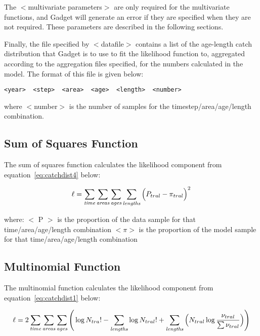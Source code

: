 \documentclass[10pt,twoside]{book}
\begin{document}
\bigskip
The $<$multivariate parameters$>$ are only required for the multivariate functions, and Gadget will generate an error if they are specified when they are not required.  These parameters are described in the following sections.

\bigskip
Finally, the file specified by $<$datafile$>$ contains a list of the age-length catch distribution that Gadget is to use to fit the likelihood function to, aggregated according to the aggregation files specified, for the numbers calculated in the model.  The format of this file is given below:

{\small\begin{verbatim}
<year>  <step>  <area>  <age>  <length>  <number>
\end{verbatim}}

where $<$number$>$ is the number of samples for the timestep/area/age/length combination.

\subsection{Sum of Squares Function}
The sum of squares function calculates the likelihood component from equation~\ref{eq:catchdist4} below:

\begin{equation}\label{eq:catchdist4}
\ell = \sum_{\it time}\sum_{\it areas}\sum_{\it ages}\sum_{\it lengths} \Big( P_{tral} - \pi_{tral} \Big) ^2
\end{equation}

where:\newline
$<$ P $>$ is the proportion of the data sample for that time/area/age/length combination\newline
$<\pi>$ is the proportion of the model sample for that time/area/age/length combination

\subsection{Multinomial Function}
The multinomial function calculates the likelihood component from equation~\ref{eq:catchdist1} below:

\begin{equation}\label{eq:catchdist1}
\ell = 2 \sum_{\it time}\sum_{\it areas}\sum_{\it ages} \Bigg( \log N_{tra}! - \sum_{\it lengths} \log N_{tral}! + \sum_{\it lengths} \Big( N_{tral} \log {\frac{\nu_{tral}}{\sum \nu_{tral}}} \Big) \Bigg)
\end{equation}
\end{document}
